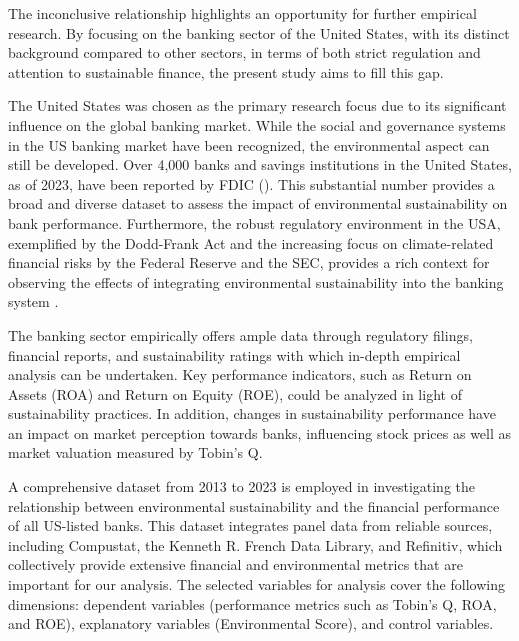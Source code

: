 \documentclass[11pt, a4paper]{article}
\begin{document}
The inconclusive relationship highlights an opportunity for further empirical research. By focusing on the banking sector of the United States, with its distinct background compared to other sectors, in terms of both strict regulation and attention to sustainable finance, the present study aims to fill this gap. 

The United States was chosen as the primary research focus due to its significant influence on the global banking market. While the social and governance systems in the US banking market have been recognized, the environmental aspect can still be developed. Over 4,000 banks and savings institutions in the United States, as of 2023, have been reported by FDIC (\citeyear{FDIC2024}). This substantial number provides a broad and diverse dataset to assess the impact of environmental sustainability on bank performance. Furthermore, the robust regulatory environment in the USA, exemplified by the Dodd-Frank Act and the increasing focus on climate-related financial risks by the Federal Reserve and the SEC, provides a rich context for observing the effects of integrating environmental sustainability into the banking system \citep{Duffie2019}.

The banking sector empirically offers ample data through regulatory filings, financial reports, and sustainability ratings with which in-depth empirical analysis can be undertaken. Key performance indicators, such as Return on Assets (ROA) and Return on Equity (ROE), could be analyzed in light of sustainability practices. In addition, changes in sustainability performance have an impact on market perception towards banks, influencing stock prices as well as market valuation measured by Tobin's Q.


A comprehensive dataset from 2013 to 2023 is employed in investigating the relationship between environmental sustainability and the financial performance of all US-listed banks. This dataset integrates panel data from reliable sources, including Compustat, the Kenneth R. French Data Library, and Refinitiv, which collectively provide extensive financial and environmental metrics that are important for our analysis. The selected variables for analysis cover the following dimensions: dependent variables (performance metrics such as Tobin’s Q, ROA, and ROE), explanatory variables (Environmental Score), and control variables.
\end{document}
